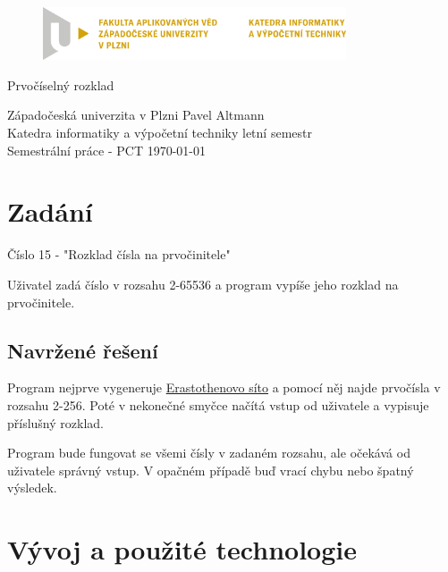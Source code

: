 \documentclass[12pt]{article}
\begin{document}
\begin{figure}[H]
	\centering
	\includegraphics[width=0.8\textwidth]{pic/LOGO_KIV_CMYK.png}
\end{figure}

\begin{center}
	\vspace{.5cm}
	\LARGE{Prvočíselný rozklad}\\
\end{center}

\vfill

\noindent
Západočeská univerzita v Plzni \hfill Pavel Altmann\\
Katedra informatiky a výpočetní techniky \hfill letní semestr\\
Semestrální práce - PCT \hfill \today
\thispagestyle{empty}

\newpage
\setcounter{page}{1}

\tableofcontents

\newpage

\section{Zadání}

Číslo 15 - "Rozklad čísla na prvočinitele"

Uživatel zadá číslo v rozsahu 2-65536 a program vypíše jeho rozklad na
prvočinitele.

\subsection{Navržené řešení}

Program nejprve vygeneruje
\href{https://cs.wikipedia.org/wiki/Eratosthenovo_s%C3%ADto}{Erastothenovo
	síto} a pomocí něj najde prvočísla v rozsahu 2-256. Poté v nekonečné smyčce
načítá vstup od uživatele a vypisuje příslušný rozklad.

Program bude fungovat se všemi čísly v zadaném rozsahu, ale očekává od uživatele
správný vstup. V opačném případě buď vrací chybu nebo špatný výsledek.

\section{Vývoj a použité technologie}
\end{document}
